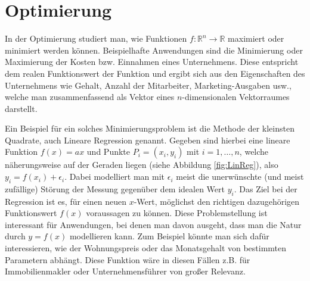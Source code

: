 \section{Optimierung}

In der Optimierung studiert man, wie Funktionen $f: \mathbb{R}^n \rightarrow \mathbb{R}$ maximiert oder minimiert werden können. Beispielhafte Anwendungen sind die Minimierung oder Maximierung der Kosten bzw. Einnahmen eines Unternehmens. Diese entspricht dem realen Funktionswert der Funktion und ergibt sich aus den Eigenschaften des Unternehmens wie Gehalt, Anzahl der Mitarbeiter, Marketing-Ausgaben usw., welche man zusammenfassend als Vektor eines $n$-dimensionalen Vektorraumes darstellt.

\begin{Bsp}
\label{bsp:regression}
Ein Beispiel für ein solches Minimierungsproblem ist die Methode der kleinsten Quadrate, auch Lineare Regression genannt. Gegeben sind hierbei eine lineare Funktion $f(x) = ax$ und Punkte $P_i=(x_i,y_i)$ mit $i=1,\dots,n$, welche näherungsweise auf der Geraden liegen (siehe Abbildung \ref{fig:LinReg}), also $y_i = f(x_i) + \epsilon_{i}$. Dabei modelliert man mit $\epsilon_i$ meist die unerw\"unschte (und meist zuf\"allige) St\"orung der Messung gegen\"uber dem idealen Wert $y_i$. Das Ziel bei der Regression ist es, f\"ur einen neuen $x$-Wert, m\"oglichst den richtigen dazugeh\"origen Funktionswert $f(x)$ voraussagen zu k\"onnen. Diese Problemstellung ist interessant f\"ur Anwendungen, bei denen man davon ausgeht, dass man die Natur durch $y = f(x)$ modellieren kann. Zum Beispiel k\"onnte man sich daf\"ur interessieren, wie der Wohnungspreis oder das Monatsgehalt von bestimmten Parametern abh\"angt. Diese Funktion w\"are in diesen F\"allen z.B. für Immobilienmakler oder Unternehmensf\"uhrer von gro\ss er Relevanz.
\end{Bsp}


